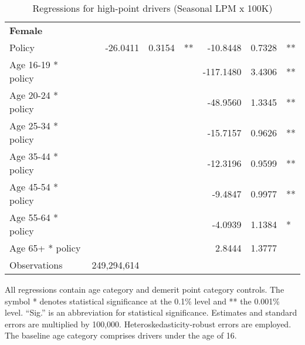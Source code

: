\begin{table}
\begin{tabular}{l r r l r r l}
\hline 

\textbf{Female} \\ 

Policy             &  -26.0411        &  0.3154       &   **       &  -10.8448        &  0.7328       &   **       \\ 
Age 16-19 * policy           & & &  &  -117.1480        &  3.4306       &   **       \\ 
Age 20-24 * policy           & & &  &  -48.9560        &  1.3345       &   **       \\ 
Age 25-34 * policy           & & &  &  -15.7157        &  0.9626       &   **       \\ 
Age 35-44 * policy           & & &  &  -12.3196        &  0.9599       &   **       \\ 
Age 45-54 * policy           & & &  &  -9.4847        &  0.9977       &   **       \\ 
Age 55-64 * policy           & & &  &  -4.0939        &  1.1384       &    *       \\ 
Age 65+ * policy           & & &  &  2.8444        &  1.3777       &            \\ 
Observations & 249,294,614 \\ 


\hline 

\end{tabular} 
\caption{Regressions for high-point drivers (Seasonal LPM x 100K)} 
All regressions contain age category and demerit point category controls. 
The symbol * denotes statistical significance at the 0.1\% level 
and ** the 0.001\% level. 
``Sig.'' is an abbreviation for statistical significance. 
Estimates and standard errors are multiplied by 100,000. 
Heteroskedasticity-robust errors are employed. 
The baseline age category comprises drivers under the age of 16. 
\label{tab:seas_LPMx100K_high_pt_regs} 
\end{table} 
 
